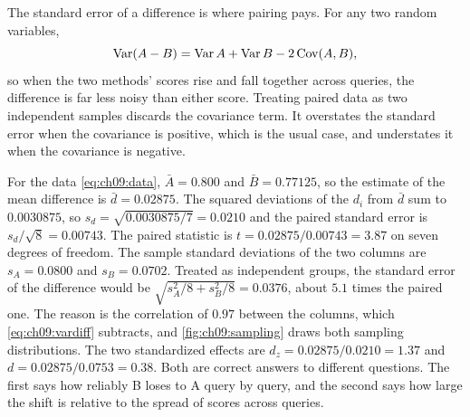 The standard error of a difference is where pairing pays. For any two random variables,
\begin{equation}
\operatorname{Var}(A-B)=\operatorname{Var} A+\operatorname{Var} B-2\operatorname{Cov}(A,B),
\label{eq:ch09:vardiff}
\end{equation}
so when the two methods' scores rise and fall together across queries, the difference is far less noisy than either score. Treating paired data as two independent samples discards the covariance term. It overstates the standard error when the covariance is positive, which is the usual case, and understates it when the covariance is negative.

\begin{example}\label{ex:ch09:paired}
For the data \eqref{eq:ch09:data}, $\bar A=0.800$ and $\bar B=0.77125$, so the estimate of the mean difference is $\bar d=0.02875$. The squared deviations of the $d_i$ from $\bar d$ sum to $0.0030875$, so $s_d=\sqrt{0.0030875/7}=0.0210$ and the paired standard error is $s_d/\sqrt8=0.00743$. The paired statistic is $t=0.02875/0.00743=3.87$ on seven degrees of freedom. The sample standard deviations of the two columns are $s_A=0.0800$ and $s_B=0.0702$. Treated as independent groups, the standard error of the difference would be $\sqrt{s_A^2/8+s_B^2/8}=0.0376$, about $5.1$ times the paired one. The reason is the correlation of $0.97$ between the columns, which \eqref{eq:ch09:vardiff} subtracts, and \cref{fig:ch09:sampling} draws both sampling distributions. The two standardized effects are $d_z=0.02875/0.0210=1.37$ and $d=0.02875/0.0753=0.38$. Both are correct answers to different questions. The first says how reliably B loses to A query by query, and the second says how large the shift is relative to the spread of scores across queries.
\end{example}

